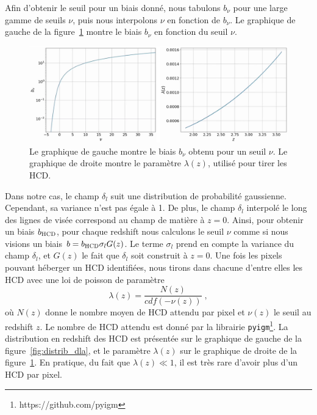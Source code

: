 \documentclass[11pt, twoside, a4paper, openright]{report}
\begin{document}
Afin d'obtenir le seuil pour un biais donné, nous tabulons $b_{\nu}$ pour une large gamme de seuils $\nu$, puis nous interpolons  $\nu$ en fonction de $b_{\nu}$.
  Le graphique de gauche de la figure~\ref{fig:bnu_lambda} montre le biais $b_{\nu}$ en fonction du seuil $\nu$.
\begin{figure}
  \centering
  \includegraphics[scale=0.42]{bnu_lambda}
  \caption{Le graphique de gauche montre le biais $b_{\nu}$ obtenu pour un seuil $\nu$. Le graphique de droite montre le paramètre $\lambda(z)$, utilisé pour tirer les HCD.}
  \label{fig:bnu_lambda}
\end{figure}
Dans notre cas, le champ $\delta_l$ suit une distribution de probabilité gaussienne. Cependant, sa variance n'est pas égale à 1. De plus, le champ $\delta_l$ interpolé le long des lignes de visée correspond au champ de matière à $z=0$. Ainsi, pour obtenir un biais $b_{\textsc{HCD}}$, pour chaque redshift nous  calculons le seuil $\nu$ comme si nous visions un biais $b = b_{\textsc{HCD}} \sigma_l G(z)$. Le terme $\sigma_l$ prend en compte la variance du champ $\delta_l$, et $G(z)$ le fait que $\delta_l$ soit construit à $z=0$.
Une fois les pixels pouvant héberger un HCD identifiées, nous tirons dans chacune d'entre elles les HCD avec une loi de poisson de paramètre
\begin{equation}
  \lambda(z) = \frac{N(z)}{cdf(-\nu(z))} \; ,
\end{equation}
où $N(z)$ donne le nombre moyen de HCD attendu par pixel et $\nu(z)$ le seuil au redshift $z$. Le nombre de HCD attendu est donné par la librairie \texttt{pyigm}\footnote{https://github.com/pyigm}. La distribution en redshift des HCD est présentée sur le graphique de gauche de la figure~\ref{fig:distrib_dla}, et le paramètre $\lambda(z)$ sur le graphique de droite de la figure~\ref{fig:bnu_lambda}. En pratique, du fait que $\lambda(z) \ll 1$, il est très rare d'avoir plus d'un HCD par pixel.
\end{document}
